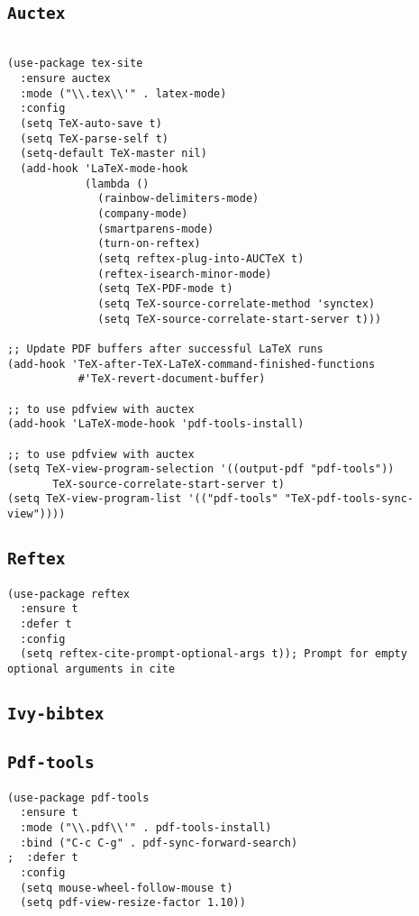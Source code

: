 \documentclass[11pt]{article}
\begin{document}
\subsection{\texttt{Auctex}}
\label{sec:org5f25adf}


\begin{verbatim}

(use-package tex-site
  :ensure auctex
  :mode ("\\.tex\\'" . latex-mode)
  :config
  (setq TeX-auto-save t)
  (setq TeX-parse-self t)
  (setq-default TeX-master nil)
  (add-hook 'LaTeX-mode-hook
            (lambda ()
              (rainbow-delimiters-mode)
              (company-mode)
              (smartparens-mode)
              (turn-on-reftex)
              (setq reftex-plug-into-AUCTeX t)
              (reftex-isearch-minor-mode)
              (setq TeX-PDF-mode t)
              (setq TeX-source-correlate-method 'synctex)
              (setq TeX-source-correlate-start-server t)))

;; Update PDF buffers after successful LaTeX runs
(add-hook 'TeX-after-TeX-LaTeX-command-finished-functions
           #'TeX-revert-document-buffer)

;; to use pdfview with auctex
(add-hook 'LaTeX-mode-hook 'pdf-tools-install)

;; to use pdfview with auctex
(setq TeX-view-program-selection '((output-pdf "pdf-tools"))
       TeX-source-correlate-start-server t)
(setq TeX-view-program-list '(("pdf-tools" "TeX-pdf-tools-sync-view"))))
\end{verbatim}

\subsection{\texttt{Reftex}}
\label{sec:org369e28d}

\begin{verbatim}
(use-package reftex
  :ensure t
  :defer t
  :config
  (setq reftex-cite-prompt-optional-args t)); Prompt for empty optional arguments in cite
\end{verbatim}
\subsection{\texttt{Ivy-bibtex}}
\label{sec:org39acbe7}
\subsection{\texttt{Pdf-tools}}
\label{sec:orgd4c33dc}
\begin{verbatim}
(use-package pdf-tools
  :ensure t
  :mode ("\\.pdf\\'" . pdf-tools-install)
  :bind ("C-c C-g" . pdf-sync-forward-search)
;  :defer t
  :config
  (setq mouse-wheel-follow-mouse t)
  (setq pdf-view-resize-factor 1.10))
\end{verbatim}
\end{document}
